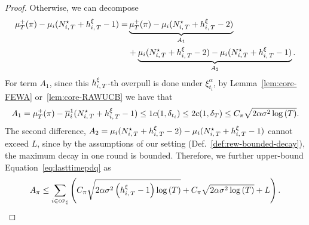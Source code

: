 \begin{proof}
Otherwise, we can decompose 
\begin{align*}
\mu^+_T(\pi) - \mu_i(\NiT^{\star} + \hiT^\xi - 1) %
= &\underbrace{\mu^+_T(\pi) - \mu_i(\NiT^{\star} + \hiT^\xi-2)}_{A_1} \\&+ 
\underbrace{\mu_i(\NiT^{\star} + \hiT^\xi-2) -  \mu_i(\NiT^{\star} + \hiT^\xi - 1)}_{A_2}.
\end{align*}
For term $A_1$, since this $h_{i,\,T}^\xi$-th overpull is done under $\xi^\alpha_{t_i}$, by Lemma~\ref{lem:core-FEWA} or~\ref{lem:core-RAWUCB} we have that
\[
A_1 = \mu^+_T(\pi) - \overline{\mu}_i^1(N_{i,\,T}^{\star} + h_{i,\,T}^\xi-1) \leq 1c(1, \delta_{t_i}) \leq 2c(1,\delta_{T}) \leq C_\pi\sqrt{2\alpha\sigma^2\log\left(T\right)} .
\] 
The second difference, 
$A_2 = \mu_i(N_{i,\,T}^{\star} + h_{i,\,T}^\xi-2) -  \mu_i(N_{i,\,T}^{\star} + h_{i,\,T}^\xi - 1 )$  
cannot exceed $L$, since by the assumptions of our setting  (Def.~\ref{def:rew-bounded-decay}), the maximum decay in one round is bounded.
Therefore, we further upper-bound Equation~\ref{eq:lasttimepdq} as
\begin{align}
A_{\pi} \leq \sum_{i\in \textsc{op}_\xi} \left(C_\pi\sqrt{2\alpha\sigma^2\left(h_{i,\,T}^\xi -1\right)\log\left(T\right)} +C_\pi\sqrt{2\alpha\sigma^2\log{\left(T\right)}}+  L\right).
\label{HPevent0}
\end{align}
\end{proof}

\label{proof1}
\restaalgoindepub*
\label{proof2} 


